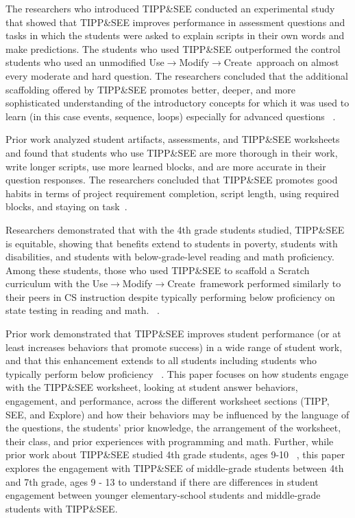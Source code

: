 \documentclass[sigconf,manuscript,review,anonymous]{acmart} %
\def\ts{TIPP\&SEE}
\def\umc{Use\begin{math}\rightarrow\end{math}Modify\begin{math}\rightarrow\end{math}Create\ }
\begin{document}
The researchers who introduced \ts{} conducted an experimental study that showed that \ts{} improves performance in assessment questions and tasks in which the students were asked to explain scripts in their own words and make predictions. The students who used \ts{} outperformed the control students who used an unmodified \umc approach on almost every moderate and hard question. The researchers concluded that the additional scaffolding offered by \ts{} promotes better, deeper, and more sophisticated understanding of the introductory concepts for which it was used to learn (in this case events, sequence, loops) especially for advanced questions ~\cite{salac2020tippnsee}.

Prior work analyzed student artifacts, assessments, and \ts{} worksheets and found that students who use \ts{} are more thorough in their work, write longer scripts, use more learned blocks, and are more accurate in their question responses. The researchers concluded that \ts{} promotes good habits in terms of project requirement completion, script length, using required blocks, and staying on task~\cite{10.1145/3372782.3406257}. 

Researchers demonstrated that with the 4th grade students studied, \ts{} is equitable, showing that benefits extend to students in poverty, students with disabilities, and students with below-grade-level reading and math proficiency. Among these students, those who used \ts{} to scaffold a Scratch curriculum with the \umc framework performed similarly to their peers in CS instruction despite typically performing below proficiency on state testing in reading and math. ~\cite{10.1145/3408877.3432366}. 

Prior work demonstrated that \ts{} improves student performance (or at least increases behaviors that promote success) in a wide range of student work, and that this enhancement extends to all students including students who typically perform below proficiency ~\cite{10.1145/3408877.3432366, 10.1145/3372782.3406257,salac2020tippnsee}. This paper focuses on how students engage with the \ts{} worksheet, looking at student answer behaviors, engagement, and performance, across the different worksheet sections (TIPP, SEE, and Explore) and how their behaviors may be influenced by the language of the questions, the students’ prior knowledge, the arrangement of the worksheet, their class, and prior experiences with programming and math. Further, while prior work about \ts{} studied 4th grade students, ages 9-10 ~\cite{10.1145/3408877.3432366, 10.1145/3372782.3406257,salac2020tippnsee}, this paper explores the engagement with \ts{} of middle-grade students between 4th and 7th grade, ages 9 - 13 to understand if there are differences in student engagement between younger elementary-school students and middle-grade students with \ts{}.
\end{document}
